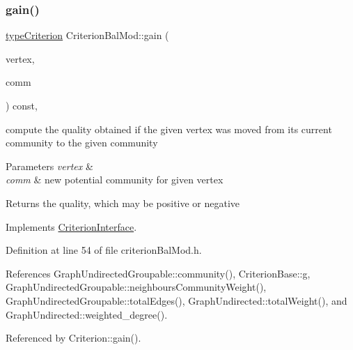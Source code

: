 \subsubsection{\texorpdfstring{gain()}{gain()}}
{\footnotesize\ttfamily \hyperlink{criterionInterface_8h_af71ff22f6355fd69a4a62104bfd59a83}{type\+Criterion} Criterion\+Bal\+Mod\+::gain (\begin{DoxyParamCaption}\item[{const \hyperlink{edge_8h_a5fbd20c46956d479cb10afc9855223f6}{type\+Vertex} \&}]{vertex,  }\item[{const \hyperlink{graphUndirectedGroupable_8h_a914da95c9ea7f14f4b7f875c36818556}{type\+Community} \&}]{comm }\end{DoxyParamCaption}) const\hspace{0.3cm}{\ttfamily [inline]}, {\ttfamily [virtual]}}

compute the quality obtained if the given vertex was moved from its current community to the given community


\begin{DoxyParams}{Parameters}
{\em vertex} & \\
\hline
{\em comm} & new potential community for given vertex \\
\hline
\end{DoxyParams}
\begin{DoxyReturn}{Returns}
the quality, which may be positive or negative 
\end{DoxyReturn}


Implements \hyperlink{classCriterionInterface_aa0beec8287cd70e16c057e7995d0caca}{Criterion\+Interface}.



Definition at line 54 of file criterion\+Bal\+Mod.\+h.



References Graph\+Undirected\+Groupable\+::community(), Criterion\+Base\+::g, Graph\+Undirected\+Groupable\+::neighbours\+Community\+Weight(), Graph\+Undirected\+Groupable\+::total\+Edges(), Graph\+Undirected\+::total\+Weight(), and Graph\+Undirected\+::weighted\+\_\+degree().



Referenced by Criterion\+::gain().


